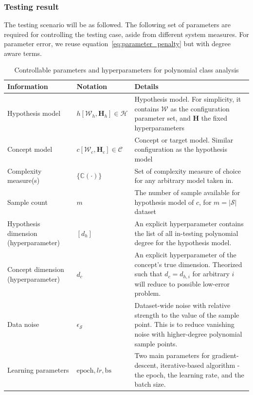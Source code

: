 \documentclass[10pt]{article} %
\begin{document}
\subsubsection{Testing result}
The testing scenario will be as followed. The following set of parameters are required for controlling the testing case, aside from different system measures. For parameter error, we reuse equation~\ref{eq:parameter_penalty} but with degree aware terms. 

\begin{table}[htb]
  \centering
  \footnotesize
  \begin{threeparttable}
    \caption{Controllable parameters and hyperparameters for polynomial class analysis}
    \label{tab:polynomial_test}
    \begin{tabularx}{\textwidth}{@{} L{0.25\textwidth}
                                     L{0.2\textwidth}
                                     >{\RaggedRight\arraybackslash}X @{}}
      \toprule
      \textbf{Information} & \textbf{Notation} & \textbf{Details} \\
      \midrule
      Hypothesis model
        & $h[\mathcal{W}_{h},\mathbf{H}_{h}]\in \mathcal{H}$
        & Hypothesis model. For simplicity, it contains $\mathcal{W}$ as the configuration parameter set, and $\mathbf{H}$ the fixed hyperparameters \\
      \addlinespace[1pt]
      Concept model
        & $c[\mathcal{W}_{c},\mathbf{H}_{c}]\in \mathcal{C}$
        & Concept or target model. Similar configuration as the hypothesis model \\
      \addlinespace[1pt]
      Complexity measure(s)
        & $\{\mathbb{C}(\cdot)\}$
        & Set of complexity measure of choice for any arbitrary model taken in. \\
      \addlinespace[1pt]
      Sample count
        & $m$
        & The number of sample available for hypothesis model of $c$, for $m=|\mathcal{S}|$ dataset\\
      \addlinespace[1pt]
      Hypothesis dimension (hyperparameter)
        & $[d_{h}]$
        & An explicit hyperparameter contains the list of all in-testing polynomial degree for the hypothesis model. \\
      \addlinespace[1pt]
      Concept dimension (hyperparameter)
        & $d_{c}$
        & An explicit hyperparameter of the concept's true dimension. Theorized such that $d_{c}=d_{h,i}$ for arbitrary $i$ will reduce to possible low-error problem.\\
      \addlinespace[1pt]
      Data noise
        & $\epsilon_{\mathcal{S}}$
        & Dataset-wide noise with relative strength to the value of the sample point. This is to reduce vanishing noise with higher-degree polynomial sample points. \\
      \addlinespace[1pt]
      Learning parameters
        & $\mathrm{epoch}, lr, \mathrm{bs}$
        & Two main parameters for gradient-descent, iterative-based algorithm - the epoch, the learning rate, and the batch size.\\
      \bottomrule
    \end{tabularx}


\end{threeparttable}
\end{table}
\end{document}
